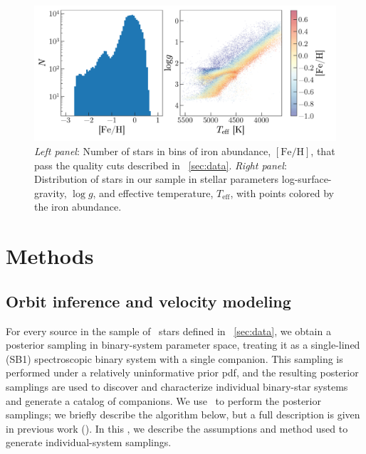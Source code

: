 \documentclass[modern, letterpaper]{aastex62}
\newcommand{\apogee}{\project{\acronym{APOGEE}}}
\newcommand{\thejoker}{\project{The~Joker}}
\begin{document}
\begin{figure}[h]
\begin{center}
\includegraphics[width=\textwidth]{logg_teff_feh.pdf}
\end{center}
\caption{%
\textit{Left panel}: Number of stars in bins of iron abundance,
$[\textrm{Fe}/\textrm{H}]$, that pass the quality cuts described in
\sectionname~\ref{sec:data}.
\textit{Right panel}: Distribution of stars in our sample in stellar parameters
log-surface-gravity, $\log g$, and effective temperature, $T_{\textrm{eff}}$,
with points colored by the iron abundance.
\label{fig:loggteff}
}
\end{figure}


\section{Methods}

\subsection{Orbit inference and velocity modeling}
\label{sec:fitting}

For every source in the sample of \apogee\ stars defined in
\sectionname~\ref{sec:data}, we obtain a posterior sampling in binary-system
parameter space, treating it as a single-lined (SB1) spectroscopic binary system
with a single companion.
This sampling is performed under a relatively uninformative prior pdf, and the
resulting posterior samplings are used to discover and characterize individual
binary-star systems and generate a catalog of companions.
We use \thejoker\ to perform the posterior samplings; we briefly describe the
algorithm below, but a full description is given in previous work
(\citealt{Price-Whelan:2017}).
In this \sectionname, we describe the assumptions and method used to generate
individual-system samplings.
\end{document}
